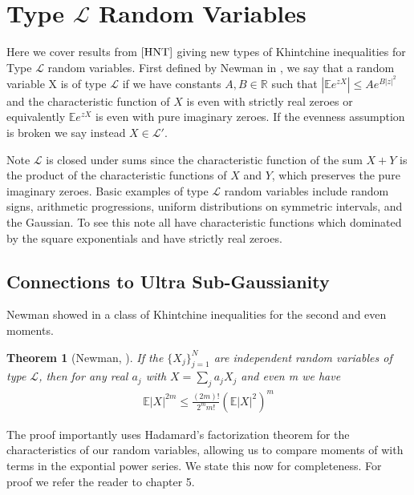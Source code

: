\documentclass[10pt]{article}
\newcommand{\E}{\mathbb{E}}
\newcommand{\1}{\textbf{1}}
\newcommand{\R}{\mathbb{R}}
\newtheorem{theorem}{Theorem}[subsection]
\theoremstyle{remark}
\theoremstyle{definition}
\begin{document}
\newpage

\section{Type $\mathcal{L}$ Random Variables}

Here we cover results from $\cite{HNT}$ giving new types of Khintchine inequalities for Type $\mathcal{L}$ random variables. First defined by Newman in \cite{N}, we say that a random variable X is of type $\mathcal{L}$ if we have constants $A,B \in \R$ such that $|\E e^{z X}| \leq A e^{B|z|^2}$ and the characteristic function of $X$ is even with strictly real zeroes or equivalently $\E e^{zX}$ is even with pure imaginary zeroes. If the evenness assumption is broken we say instead $X \in \mathcal{L}'$. 

Note $\mathcal{L}$ is closed under sums since the characteristic function of the sum $X+Y$ is the product of the characteristic functions of $X$ and $Y$, which preserves the pure imaginary zeroes. Basic examples of type $\mathcal{L}$ random variables include random signs, arithmetic progressions, uniform distributions on symmetric intervals, and the Gaussian. To see this note all have characteristic functions which dominated by the square exponentials and have strictly real zeroes. 

\subsection{Connections to Ultra Sub-Gaussianity}

Newman showed in \cite{N} a class of Khintchine inequalities for the second and even moments.

\begin{theorem}[Newman, \cite{N}]\label{thm:L1}
	If the $\{X_j\}_{j=1}^N$ are independent random variables of type $\mathcal{L}$, then for any real $a_j$ with $X= \sum_j a_j X_j$ and even m we have
	\begin{align*}
		\E|X|^{2m} \leq \frac{(2m)!}{2^mm!}(\E|X|^2)^m
	\end{align*}
\end{theorem} The proof importantly uses Hadamard's factorization theorem for the characteristics of our random variables, allowing us to compare moments of with terms in the expontial power series. We state this now for completeness. For proof we refer the reader to \cite{StSh} chapter 5. 
\end{document}
